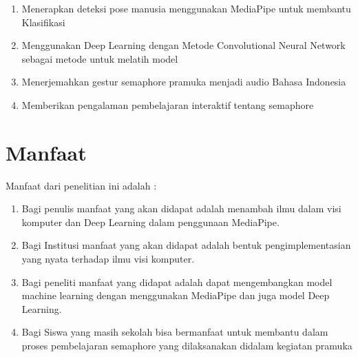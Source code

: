 \begin{enumerate}   
\item	Menerapkan deteksi pose manusia menggunakan MediaPipe untuk membantu Klasifikasi 
\item   Menggunakan Deep Learning dengan Metode Convolutional Neural Network sebagai metode untuk melatih model
\item	Menerjemahkan gestur semaphore pramuka menjadi audio Bahasa Indonesia
\item	Memberikan pengalaman pembelajaran interaktif tentang semaphore
\end{enumerate}

\section{Manfaat}

Manfaat dari penelitian ini adalah : 

\begin{enumerate}  
\item	Bagi penulis manfaat yang akan didapat adalah menambah ilmu dalam visi komputer dan Deep Learning dalam penggunaan MediaPipe.
\item	Bagi Institusi manfaat yang akan didapat adalah bentuk pengimplementasian yang nyata terhadap ilmu visi komputer.
\item	Bagi peneliti manfaat yang didapat adalah dapat mengembangkan model machine learning dengan menggunakan MediaPipe dan juga model Deep Learning.
\item	Bagi Siswa yang masih sekolah bisa bermanfaat untuk membantu dalam proses pembelajaran semaphore yang dilaksanakan didalam kegiatan pramuka
\end{enumerate}
